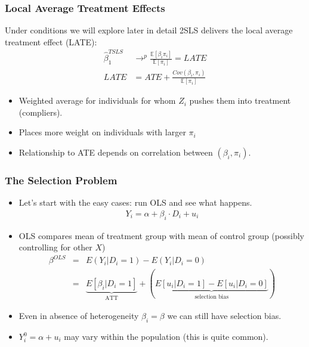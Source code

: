 \documentclass[aspectratio=169,11pt]{beamer}
\begin{document}
\begin{frame}
\frametitle{Local Average Treatment Effects}
Under conditions we will explore later in detail 2SLS delivers the \alert{local average treatment effect (LATE)}:
\begin{align*}
\widehat{\beta}_1^{TSLS} &\rightarrow^p \frac{\mathbb{E}[\beta_{i} \pi_{i}]}{\mathbb{E}[\pi_{i}]} = LATE \\
LATE &= ATE + \frac{Cov(\beta_{i},\pi_{i})}{\mathbb{E}[\pi_{i}]}
\end{align*}
\begin{itemize}
\item Weighted average for individuals for whom $Z_i$ pushes them into treatment (compliers).
\item Places more weight on individuals with larger $\pi_i$
\item Relationship to ATE depends on correlation between $(\beta_i, \pi_i)$.
\end{itemize}
\end{frame}


\begin{frame}
\frametitle{The Selection Problem}
\begin{itemize}
\item Let's start with the easy cases: run OLS and see what happens.
\begin{align*}
Y_i = \alpha + \beta_i \cdot D_i + u_i
\end{align*}
\item OLS compares mean of treatment group with mean of control group (possibly controlling for other $X$)
\begin{eqnarray*}
\beta^{OLS} &=& E(Y_i | D_i =1) - E(Y_i | D_i=0) \\
&=& \underbrace{E[\beta_i | D_i =1]}_{\mbox{ATT}} + \left(\underbrace{E[u_i | D_i =1 ] - E[u_i | D_i=0] }_{\mbox{selection bias}}  \right)
\end{eqnarray*}
\item Even in absence of heterogeneity $\beta_i = \beta$ we can still have selection bias. 
\item $Y_i^0 = \alpha + u_i$ may vary within the population (this is quite common).
\end{itemize}
\end{frame}
\end{document}
